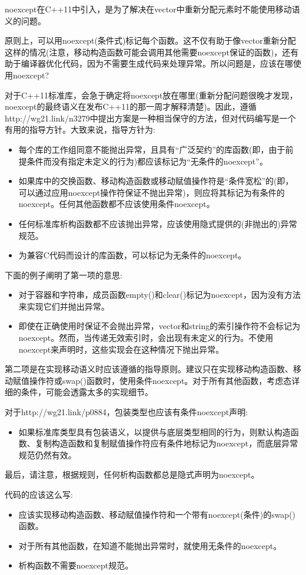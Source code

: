 noexcept在C++11中引入，是为了解决在vector中重新分配元素时不能使用移动语义的问题。

原则上，可以用noexcept(条件式)标记每个函数。这不仅有助于像vector重新分配这样的情况(注意，移动构造函数可能会调用其他需要noexcept保证的函数)，还有助于编译器优化代码，因为不需要生成代码来处理异常。所以问题是，应该在哪使用noexcept?

对于C++11标准库，会急于确定将noexcept放在哪里(重新分配问题很晚才发现，noexcept的最终语义在发布C++11的那一周才解释清楚)。因此，遵循http://wg21.link/n3279中提出方案是一种相当保守的方法，但对代码编写是一个有用的指导方针。大致来说，指导方针为:

\begin{itemize}
	\item 每个库的工作组同意不能抛出异常，且具有“广泛契约”的库函数(即，由于前提条件而没有指定未定义的行为)都应该标记为“无条件的noexcept”。
	\item 如果库中的交换函数、移动构造函数或移动赋值操作符是“条件宽松”的(即，可以通过应用noexcept操作符保证不抛出异常)，则应将其标记为有条件的noexcept。任何其他函数都不应该使用条件noexcept。
	\item 任何标准库析构函数都不应该抛出异常，应该使用隐式提供的(非抛出的)异常规范。
	\item 为兼容C代码而设计的库函数，可以标记为无条件的noexcept。
\end{itemize}

下面的例子阐明了第一项的意思:

\begin{itemize}
	\item 对于容器和字符串，成员函数empty()和clear()标记为noexcept，因为没有方法来实现它们并抛出异常。
	\item 即使在正确使用时保证不会抛出异常，vector和string的索引操作符不会标记为noexcept。然而，当传递无效索引时，会出现有未定义的行为。不使用noexcept来声明时，这些实现会在这种情况下抛出异常。
\end{itemize}

第二项是在实现移动语义时应该遵循的指导原则。建议只在实现移动构造函数、移动赋值操作符或swap()函数时，使用条件noexcept。对于所有其他函数，考虑态详细的条件，可能会透露太多的实现细节。

对于http://wg21.link/p0884，包装类型也应该有条件noexcept声明:

\begin{itemize}
	\item 如果标准库类型具有包装语义，以提供与底层类型相同的行为，则默认构造函数、复制构造函数和复制赋值操作符应有条件地标记为noexcept，而底层异常规范仍然有效。
\end{itemize}

最后，请注意，根据规则，任何析构函数都总是隐式声明为noexcept。

代码的应该这么写:

\begin{itemize}
	\item 应该实现移动构造函数、移动赋值操作符和一个带有noexcept(条件)的swap()函数。
	\item 对于所有其他函数，在知道不能抛出异常时，就使用无条件的noexcept。
	\item 析构函数不需要noexcept规范。
\end{itemize}







